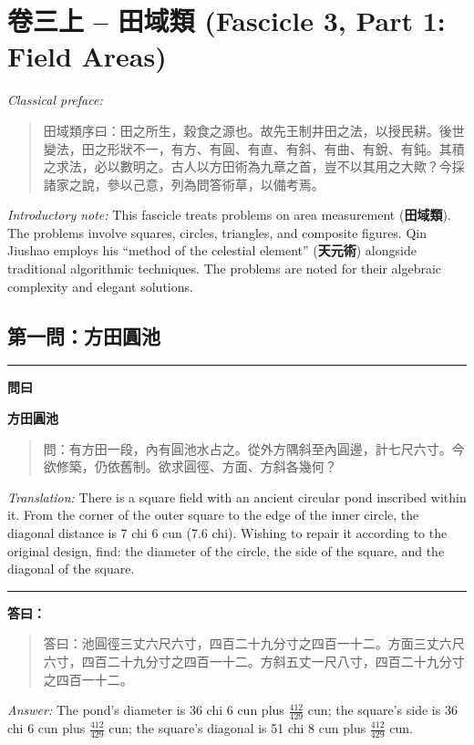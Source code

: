 \documentclass[11pt,a4paper]{article}
\newenvironment{problem}[1][]{%
  \medskip\noindent\rule{\textwidth}{0.4pt}%
  \par\noindent\textbf{\color{sectioncolor}#1}\par\nopagebreak%
  \smallskip%
}{%
  \par\noindent\rule{\textwidth}{0.4pt}\medskip%
}
\newenvironment{answer}{%
  \medskip\noindent{\color{answercolor}\rule{0.5\textwidth}{0.5pt}}%
  \par\color{answercolor}%
}{%
  \par\medskip%
}
\begin{document}
\newpage

\section{卷三上 -- 田域類 (Fascicle 3, Part 1: Field Areas)}
\label{sec:juan3shang}

\noindent\textit{Classical preface:}
\begin{quote}
\textcolor{chinacolor}{%
田域類序曰：田之所生，穀食之源也。故先王制井田之法，以授民耕。後世變法，田之形狀不一，有方、有圓、有直、有斜、有曲、有銳、有鈍。其積之求法，必以數明之。古人以方田術為九章之首，豈不以其用之大歟？今採諸家之說，參以己意，列為問答術草，以備考焉。
}
\end{quote}

\noindent\textit{Introductory note:} This fascicle treats problems on area 
measurement (\textbf{田域類}). The problems involve squares, circles, triangles, and 
composite figures. Qin Jiushao employs his ``method of the celestial element'' 
(\textbf{天元術}) alongside traditional algorithmic techniques. The problems are noted 
for their algebraic complexity and elegant solutions.

\subsection*{第一問：方田圓池}

\begin{problem}[\textbf{問曰}]
\textbf{\color{sectioncolor}方田圓池}

\begin{quote}
\textcolor{chinacolor}{%
問：有方田一段，內有圓池水占之。從外方隅斜至內圓邊，計七尺六寸。今欲修築，仍依舊制。欲求圓徑、方面、方斜各幾何？
}
\end{quote}

\textit{Translation:} There is a square field with an ancient circular pond 
inscribed within it. From the corner of the outer square to the edge of 
the inner circle, the diagonal distance is 7 chi 6 cun (7.6 chi). 
Wishing to repair it according to the original design, find: the diameter 
of the circle, the side of the square, and the diagonal of the square.
\end{problem}

\begin{answer}
\textbf{答曰：}

\begin{quote}
\textcolor{chinacolor}{%
答曰：池圓徑三丈六尺六寸，四百二十九分寸之四百一十二。方面三丈六尺六寸，四百二十九分寸之四百一十二。方斜五丈一尺八寸，四百二十九分寸之四百一十二。
}
\end{quote}

\textit{Answer:} The pond's diameter is 36 chi 6 cun plus $\frac{412}{429}$ cun; 
the square's side is 36 chi 6 cun plus $\frac{412}{429}$ cun; the square's 
diagonal is 51 chi 8 cun plus $\frac{412}{429}$ cun.
\end{answer}
\end{document}
